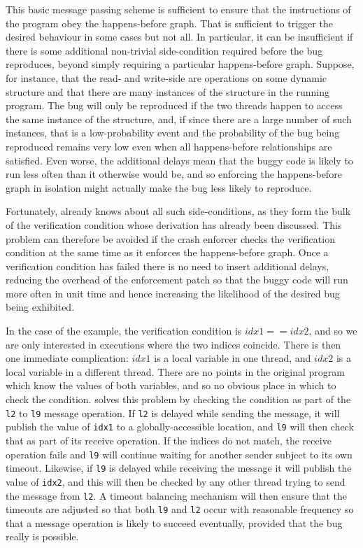 This basic message passing scheme is sufficient to ensure that the
instructions of the program obey the happens-before graph.  That is
sufficient to trigger the desired behaviour in some cases but not all.
In particular, it can be insufficient if there is some additional
non-trivial side-condition required before the bug reproduces, beyond
simply requiring a particular happens-before graph.  Suppose, for
instance, that the read- and write-side {\StateMachines} are
operations on some dynamic structure and that there are many instances
of the structure in the running program.  The bug will only be
reproduced if the two threads happen to access the same instance of
the structure, and, if since there are a large number of such
instances, that is a low-probability event and the probability of the
bug being reproduced remains very low even when all happens-before
relationships are satisfied.  Even worse, the additional delays mean
that the buggy code is likely to run less often than it otherwise
would be, and so enforcing the happens-before graph in isolation might
actually make the bug less likely to reproduce.

Fortunately, {\technique} already knows about all such
side-conditions, as they form the bulk of the verification condition
whose derivation has already been discussed.  This problem can
therefore be avoided if the crash enforcer checks the verification
condition at the same time as it enforces the happens-before graph.
Once a verification condition has failed there is no need to insert
additional delays, reducing the overhead of the enforcement patch so
that the buggy code will run more often in unit time and hence
increasing the likelihood of the desired bug being exhibited.

In the case of the example, the verification condition is $idx1 ==
idx2$, and so we are only interested in executions where the two
indices coincide.  There is then one immediate complication: $idx1$ is
a local variable in one thread, and $idx2$ is a local variable in a
different thread.  There are no points in the original program which
know the values of both variables, and so no obvious place in which to
check the condition.  {\Technique} solves this problem by checking the
condition as part of the \verb|l2| to \verb|l9| message operation.  If
\verb|l2| is delayed while sending the message, it will publish the
value of \verb|idx1| to a globally-accessible location, and \verb|l9|
will then check that as part of its receive operation.  If the indices
do not match, the receive operation fails and \verb|l9| will continue
waiting for another sender subject to its own timeout.  Likewise, if
\verb|l9| is delayed while receiving the message it will publish the
value of \verb|idx2|, and this will then be checked by any other
thread trying to send the message from \verb|l2|.  A timeout balancing
mechanism will then ensure that the timeouts are adjusted so that both
\verb|l9| and \verb|l2| occur with reasonable frequency so that a
message operation is likely to succeed eventually, provided that the
bug really is possible.

